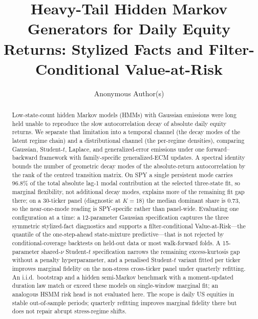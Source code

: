 \documentclass[sigconf,anonymous,pbalance]{acmart}
\begin{document}
\title{Heavy-Tail Hidden Markov Generators for Daily Equity Returns: Stylized Facts and Filter-Conditional Value-at-Risk}

\author{Anonymous Author(s)}

\renewcommand{\shortauthors}{Anon.}

\begin{abstract}
Low-state-count hidden Markov models (HMMs) with Gaussian emissions were long held unable to reproduce the slow autocorrelation decay of absolute daily equity returns. We separate that limitation into a temporal channel (the decay modes of the latent regime chain) and a distributional channel (the per-regime densities), comparing Gaussian, Student-$t$, Laplace, and generalized-error emissions under one forward--backward framework with family-specific generalized-ECM updates. A spectral identity bounds the number of geometric decay modes of the absolute-return autocorrelation by the rank of the centred transition matrix. On SPY a single persistent mode carries $96.8\%$ of the total absolute lag-1 modal contribution at the selected three-state fit, so marginal flexibility, not additional decay modes, explains more of the remaining fit gap there; on a 30-ticker panel (diagnostic at $K = 18$) the median dominant share is $0.73$, so the near-one-mode reading is SPY-specific rather than panel-wide. Evaluating one configuration at a time: a 12-parameter Gaussian specification captures the three symmetric stylized-fact diagnostics and supports a filter-conditional Value-at-Risk---the quantile of the one-step-ahead state-mixture predictive---that is not rejected by conditional-coverage backtests on held-out data or most walk-forward folds. A 15-parameter shared-$\nu$ Student-$t$ specification narrows the remaining excess-kurtosis gap without a penalty hyperparameter, and a penalised Student-$t$ variant fitted per ticker improves marginal fidelity on the non-stress cross-ticker panel under quarterly refitting. An i.i.d.\ bootstrap and a hidden semi-Markov benchmark with a moment-updated duration law match or exceed these models on single-window marginal fit; an analogous HSMM risk head is not evaluated here. The scope is daily US equities in stable out-of-sample periods; quarterly refitting improves marginal fidelity there but does not repair abrupt stress-regime shifts.
\end{abstract}
\end{document}
